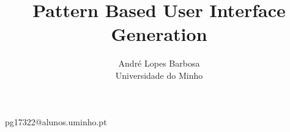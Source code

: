 \documentclass[mistar]{acmtrans2m}
\title{Pattern Based User Interface Generation}
\author{André Lopes Barbosa\\Universidade do Minho}
\begin{document}
\setcounter{page}{1}%

\begin{bottomstuff}
pg17322@alunos.uminho.pt
\end{bottomstuff}

\maketitle










\begin{received}
\end{received}
\end{document}
